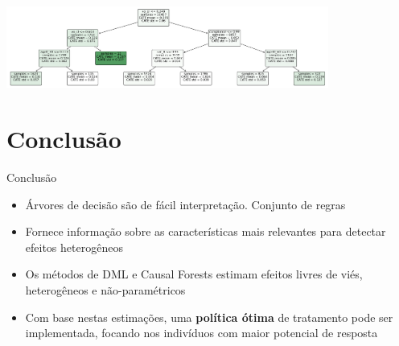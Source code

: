 \documentclass[
  12pt,
  ignorenonframetext,
  aspectratio=169]{beamer}
\begin{document}
\begin{frame}
\begin{center}\includegraphics[width=400px]{Figs/fig_tree_driv_cut} \end{center}
\end{frame}

\hypertarget{conclusuxe3o}{%
\section{Conclusão}\label{conclusuxe3o}}

\begin{frame}{Conclusão}
\begin{itemize}
\item
  Árvores de decisão são de fácil interpretação. Conjunto de regras
\item
  Fornece informação sobre as características mais relevantes para
  detectar efeitos heterogêneos
\item
  Os métodos de DML e Causal Forests estimam efeitos livres de viés,
  heterogêneos e não-paramétricos
\item
  Com base nestas estimações, uma \textbf{política ótima} de tratamento
  pode ser implementada, focando nos indivíduos com maior potencial de
  resposta
\end{itemize}
\end{frame}
\end{document}
